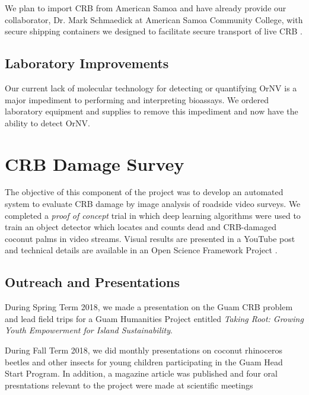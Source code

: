 \documentclass[12pt,letterpaper,english,bibliography=totocnumbered]{scrartcl}
\begin{document}
We plan to import CRB from American Samoa and have already provide our collaborator, Dr. Mark Schmaedick at American Samoa Community College, with secure shipping containers we designed to facilitate secure transport of live CRB \cite{moore_container_2017-1}.

\subsection{Laboratory Improvements}

Our current lack of molecular technology for detecting or quantifying OrNV is a major impediment to performing and interpreting bioassays. We ordered laboratory equipment and supplies to remove this impediment and now have the ability to detect OrNV. 


\section{CRB Damage Survey}

The objective of this component of the project was to develop an automated system to evaluate CRB damage by image analysis of roadside video surveys.  We completed a \textit{proof of concept} trial in which deep learning algorithms were used to train an object detector which locates and counts dead and CRB-damaged coconut palms in video streams.  Visual results are presented in a YouTube post \cite{moore_training_2019} and technical details are available in an Open Science Framework Project \cite{moore_open_2019}.

\begin{refsection}
\section{Outreach and Presentations}

During Spring Term 2018, we made a presentation on the Guam CRB problem \cite{aubrey_moore_coconut_2018-2} and lead field trips for a Guam Humanities Project entitled \textit{Taking Root: Growing Youth Empowerment for Island Sustainability}.
	
During Fall Term 2018, we did monthly presentations on coconut rhinoceros beetles and other insects for young children participating in the Guam Head Start Program. In addition, a magazine article was published \cite{moore_special_2018} and four oral presntations relevant to the project were made at scientific meetings \cite{moore_coconut_2019-2, moore_impact_2017-1, moore_failed_2018-1}

\printbibliography[heading=none]
	
\end{refsection}
\end{document}
